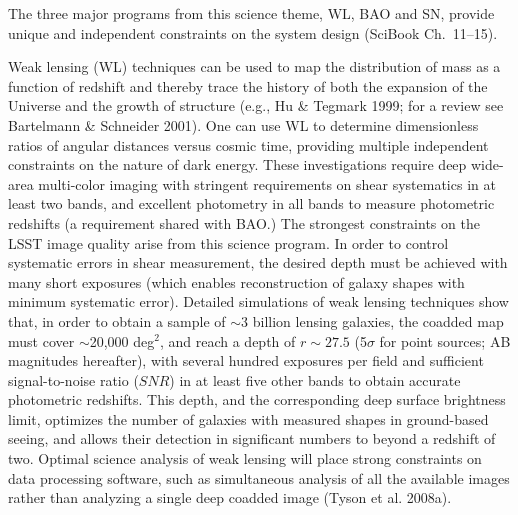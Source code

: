 \documentclass{emulateapj}
\newcommand{\B}[1]{{#1}}
\newcommand{\R}[1]{{\color{red}}}
\begin{document}
The three major programs from this science theme, WL, BAO and SN,  provide unique and independent 
constraints on the system design (SciBook Ch.~11--15). 

Weak lensing (WL) techniques can be used to map the distribution of mass as a function 
of redshift and thereby trace the history of both the expansion of the Universe and the 
growth of structure (e.g., Hu \& Tegmark 1999; for a review see
Bartelmann \& Schneider 2001). 
\R{Weak lensing of galaxies as a function of redshift probes 
both the evolution of structure over cosmic time and}
\B{One can use WL to}
 determine dimensionless ratios of 
angular distances versus cosmic time, providing multiple independent 
constraints on the nature of dark energy.  These investigations require deep wide-area
multi-color imaging with stringent requirements on shear systematics in at
least two bands, and excellent photometry in all bands to measure photometric redshifts (a requirement shared with BAO.) 
The strongest constraints on the LSST image quality arise from this science program. In
order to control systematic errors in shear measurement, 
the desired depth must be achieved with many short exposures (which enables reconstruction of 
galaxy shapes with minimum systematic error). Detailed simulations of weak lensing 
techniques show that, in order to obtain a sample of $\sim$3 billion lensing galaxies,
the coadded map must cover $\sim$20,000 deg$^2$, and reach a depth of
$r\sim27.5$ (5$\sigma$ for point sources; AB magnitudes hereafter), with several hundred exposures per
field and sufficient signal-to-noise ratio ($SNR$) in at least five other bands to obtain accurate
photometric redshifts. This depth, \B{and the corresponding deep surface brightness limit,}
optimizes the number of galaxies with measured shapes in ground-based seeing, 
and allows their detection in significant numbers to beyond a redshift of two.
\R{It is anticipated that} Optimal science analysis of weak lensing will place
strong constraints on data processing software, such as simultaneous analysis
of all the available images rather than analyzing a single deep coadded image (Tyson
et al. 2008a). 
\end{document}
